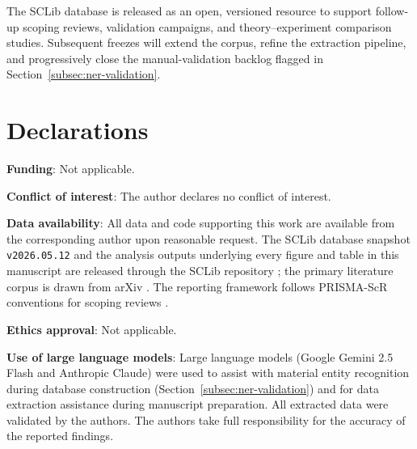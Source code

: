 \documentclass[11pt]{article}
\begin{document}
The SCLib database is released as an open, versioned resource \cite{sclib2026} to support follow-up scoping reviews, validation campaigns, and theory--experiment comparison studies. Subsequent freezes will extend the corpus, refine the extraction pipeline, and progressively close the manual-validation backlog flagged in Section~\ref{subsec:ner-validation}.

\section*{Declarations}

\textbf{Funding}: Not applicable.

\textbf{Conflict of interest}: The author declares no conflict of interest.

\textbf{Data availability}: All data and code supporting this work are available
from the corresponding author upon reasonable request. The SCLib database snapshot
\texttt{v2026.05.12} and the analysis outputs underlying every figure and table in
this manuscript are released through the SCLib repository \cite{sclib2026}; the
primary literature corpus is drawn from arXiv \cite{arxiv2026}. The reporting
framework follows PRISMA-ScR conventions for scoping reviews
\cite{pageprisma2021,tricco2018prismascr}.

\textbf{Ethics approval}: Not applicable.

\textbf{Use of large language models}: Large language models (Google Gemini 2.5
Flash and Anthropic Claude) were used to assist with material entity recognition
during database construction (Section~\ref{subsec:ner-validation}) and for data
extraction assistance during manuscript preparation. All extracted data were
validated by the authors. The authors take full responsibility for the accuracy
of the reported findings.



\end{document}
